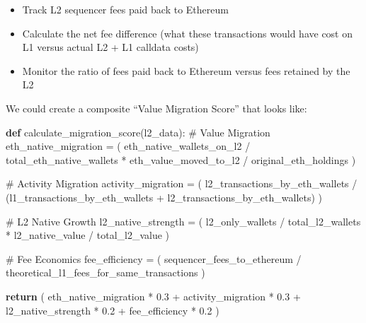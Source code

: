 \documentclass[
  letterpaper,
  DIV=11,
  numbers=noendperiod]{scrreprt}
\newenvironment{Shaded}{\begin{snugshade}}{\end{snugshade}}
\newcommand{\CommentTok}[1]{\textcolor[rgb]{0.37,0.37,0.37}{#1}}
\newcommand{\ControlFlowTok}[1]{\textcolor[rgb]{0.00,0.23,0.31}{\textbf{#1}}}
\newcommand{\FloatTok}[1]{\textcolor[rgb]{0.68,0.00,0.00}{#1}}
\newcommand{\KeywordTok}[1]{\textcolor[rgb]{0.00,0.23,0.31}{\textbf{#1}}}
\newcommand{\NormalTok}[1]{\textcolor[rgb]{0.00,0.23,0.31}{#1}}
\newcommand{\OperatorTok}[1]{\textcolor[rgb]{0.37,0.37,0.37}{#1}}
\providecommand{\tightlist}{%
  \setlength{\itemsep}{0pt}\setlength{\parskip}{0pt}}\usepackage{longtable,booktabs,array}
\begin{document}
\begin{itemize}
\tightlist
\item
  Track L2 sequencer fees paid back to Ethereum
\item
  Calculate the net fee difference (what these transactions would have
  cost on L1 versus actual L2 + L1 calldata costs)
\item
  Monitor the ratio of fees paid back to Ethereum versus fees retained
  by the L2
\end{itemize}

We could create a composite ``Value Migration Score'' that looks like:

\begin{Shaded}
\begin{Highlighting}[]
\KeywordTok{def}\NormalTok{ calculate\_migration\_score(l2\_data):}
    \CommentTok{\# Value Migration}
\NormalTok{    eth\_native\_migration }\OperatorTok{=}\NormalTok{ (}
\NormalTok{        eth\_native\_wallets\_on\_l2 }\OperatorTok{/}\NormalTok{ total\_eth\_native\_wallets }\OperatorTok{*}
\NormalTok{        eth\_value\_moved\_to\_l2 }\OperatorTok{/}\NormalTok{ original\_eth\_holdings}
\NormalTok{    )}
    
    \CommentTok{\# Activity Migration}
\NormalTok{    activity\_migration }\OperatorTok{=}\NormalTok{ (}
\NormalTok{        l2\_transactions\_by\_eth\_wallets }\OperatorTok{/} 
\NormalTok{        (l1\_transactions\_by\_eth\_wallets }\OperatorTok{+}\NormalTok{ l2\_transactions\_by\_eth\_wallets)}
\NormalTok{    )}
    
    \CommentTok{\# L2 Native Growth}
\NormalTok{    l2\_native\_strength }\OperatorTok{=}\NormalTok{ (}
\NormalTok{        l2\_only\_wallets }\OperatorTok{/}\NormalTok{ total\_l2\_wallets }\OperatorTok{*}
\NormalTok{        l2\_native\_value }\OperatorTok{/}\NormalTok{ total\_l2\_value}
\NormalTok{    )}
    
    \CommentTok{\# Fee Economics}
\NormalTok{    fee\_efficiency }\OperatorTok{=}\NormalTok{ (}
\NormalTok{        sequencer\_fees\_to\_ethereum }\OperatorTok{/} 
\NormalTok{        theoretical\_l1\_fees\_for\_same\_transactions}
\NormalTok{    )}
    
    \ControlFlowTok{return}\NormalTok{ (}
\NormalTok{        eth\_native\_migration }\OperatorTok{*} \FloatTok{0.3} \OperatorTok{+}
\NormalTok{        activity\_migration }\OperatorTok{*} \FloatTok{0.3} \OperatorTok{+}
\NormalTok{        l2\_native\_strength }\OperatorTok{*} \FloatTok{0.2} \OperatorTok{+}
\NormalTok{        fee\_efficiency }\OperatorTok{*} \FloatTok{0.2}
\NormalTok{    )}
\end{Highlighting}
\end{Shaded}
\end{document}
